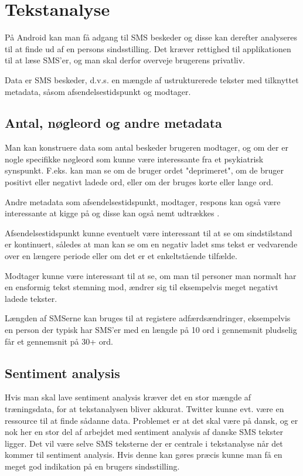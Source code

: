 \section{Tekstanalyse}
På Android kan man få adgang til SMS beskeder og disse kan derefter analyseres til at finde ud af en persons sindsstilling. Det kræver rettighed til applikationen til at læse SMS'er, og man skal derfor overveje brugerens privatliv. 

Data er SMS beskeder, d.v.s. en mængde af ustrukturerede tekster med tilknyttet metadata, såsom afsendelsestidspunkt og modtager.

\subsection{Antal, nøgleord og andre metadata}
Man kan konstruere data som antal beskeder brugeren modtager, og om der er nogle specifikke nøgleord som kunne være interessante fra et psykiatrisk synspunkt. F.eks. kan man se om de bruger ordet "deprimeret", om de bruger positivt eller negativt ladede ord, eller om der bruges korte eller lange ord. 

Andre metadata som afsendelsestidspunkt, modtager, respons kan også være interessante at kigge på og disse kan også nemt udtrækkes \citep{misc:androidsmsread}.

Afsendelsestidspunkt kunne eventuelt være interessant til at se om sindstilstand er kontinuert, således at man kan se om en negativ ladet sms tekst er vedvarende over en længere periode eller om det er et enkeltstående tilfælde.
		
Modtager kunne være interessant til at se, om man til personer man normalt har en ensformig tekst stemning mod, ændrer sig til eksempelvis meget negativt ladede tekster.

Længden af SMSerne kan bruges til at registere adfærdsændringer, eksempelvis en person der typisk har SMS'er med en længde på 10 ord i gennemsnit pludselig får et gennemsnit på 30+ ord.


\subsection{Sentiment analysis}
Hvis man skal lave sentiment analysis kræver det en stor mængde af træningsdata, for at tekstanalysen bliver akkurat. Twitter kunne evt. være en ressource til at finde sådanne data. Problemet er at det skal være på dansk, og er nok her en stor del af arbejdet med sentiment analysis af danske SMS tekster ligger.
Det vil være selve SMS teksterne der er centrale i tekstanalyse når det kommer til sentiment analysis. 
Hvis denne kan gøres præcis kunne man få en meget god indikation på en brugers sindsstilling.

